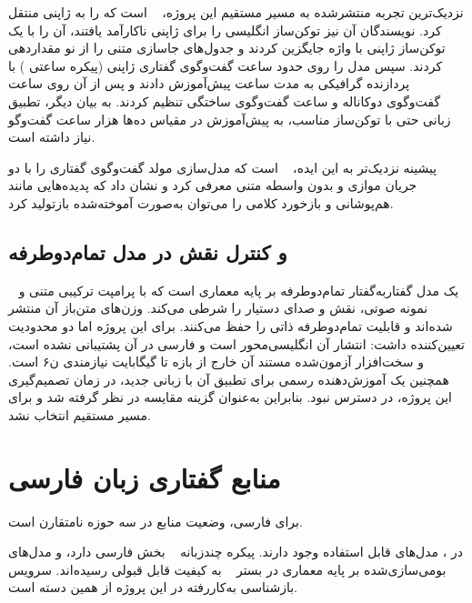 نزدیک‌ترین تجربه منتشرشده به مسیر مستقیم این پروژه، ~\cite{ohashi2025jmoshi}
است که  را به ژاپنی منتقل کرد. نویسندگان آن نیز توکن‌ساز انگلیسی
 را برای ژاپنی ناکارآمد یافتند، آن را با یک توکن‌ساز 
ژاپنی با  واژه جایگزین کردند و جدول‌های جاسازی متنی را از نو
مقداردهی کردند. سپس مدل را روی حدود  ساعت گفت‌وگوی گفتاری ژاپنی
(پیکره  ساعتی ) با  پردازنده گرافیکی  به
مدت  ساعت پیش‌آموزش دادند و پس از آن روی  ساعت گفت‌وگوی دوکاناله
و  ساعت گفت‌وگوی ساختگی تنظیم کردند. به بیان دیگر، تطبیق زبانی
 حتی با توکن‌ساز مناسب، به پیش‌آموزش در مقیاس ده‌ها هزار ساعت
گفت‌وگو نیاز داشته است.

پیشینه نزدیک‌تر به این ایده،
~\cite{nguyen2023dgslm} است که مدل‌سازی مولد گفت‌وگوی گفتاری را
با دو جریان موازی و بدون واسطه متنی معرفی کرد و نشان داد که پدیده‌هایی
مانند هم‌پوشانی و بازخورد کلامی را می‌توان به‌صورت آموخته‌شده بازتولید کرد.

\subsection{ و کنترل نقش در مدل تمام‌دوطرفه}

~\cite{roy2026personaplex} یک مدل گفتار‌به‌گفتار تمام‌دوطرفه
بر پایه معماری  است که با پرامپت ترکیبی متنی و نمونه صوتی، نقش و
صدای دستیار را شرطی می‌کند. وزن‌های متن‌باز آن منتشر شده‌اند و قابلیت
تمام‌دوطرفه ذاتی را حفظ می‌کنند. برای این پروژه اما دو محدودیت تعیین‌کننده
داشت: انتشار آن انگلیسی‌محور است و فارسی در آن پشتیبانی نشده است، و
سخت‌افزار آزمون‌شده مستند آن خارج از بازه  تا  گیگابایت
نیازمندی ن۶ است. همچنین یک آموزش‌دهنده رسمی برای تطبیق آن با زبانی جدید،
در زمان تصمیم‌گیری این پروژه، در دسترس نبود. بنابراین به‌عنوان گزینه
مقایسه در نظر گرفته شد و برای مسیر مستقیم انتخاب نشد.

\section{منابع گفتاری زبان فارسی}
\label{sec:persian-resources}

برای فارسی، وضعیت منابع در سه حوزه نامتقارن است.

در ، مدل‌های قابل استفاده وجود دارند. پیکره چند‌زبانه
~\cite{ardila2020commonvoice} بخش فارسی دارد، و مدل‌های
بومی‌سازی‌شده بر پایه معماری  در بستر
~\cite{kuchaiev2019nemo} به کیفیت قابل قبولی رسیده‌اند. سرویس
بازشناسی به‌کاررفته در این پروژه از همین دسته است.

